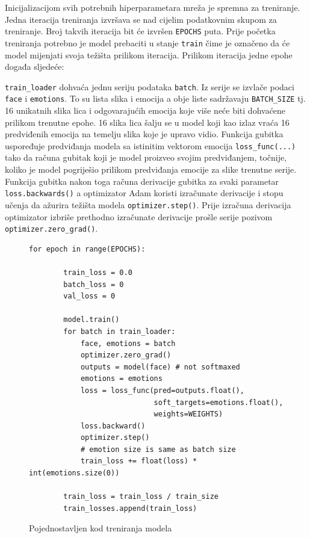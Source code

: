 \documentclass[times, utf8, zavrsni,numeric,pstricks]{fer}
\begin{document}
Inicijalizacijom svih potrebnih hiperparametara mreža je spremna za treniranje. Jedna iteracija treniranja izvršava se nad cijelim podatkovnim skupom za treniranje. Broj takvih iteracija bit će izvršen \lstinline"EPOCHS" puta. Prije početka treniranja potrebno je model prebaciti u stanje \lstinline"train" čime je označeno da će model mijenjati svoja težišta prilikom iteracija. Prilikom iteracija jedne epohe događa sljedeće:

\lstinline"train_loader" dohvaća jednu seriju podataka \lstinline"batch". Iz serije se izvlače podaci \lstinline"face" i \lstinline"emotions". To su lista slika i emocija a obje liste sadržavaju \lstinline"BATCH_SIZE" tj. 16 unikatnih slika lica i odgovarajućih emocija koje više neće biti dohvaćene prilikom trenutne epohe. 16 slika lica šalju se u model koji kao izlaz vraća 16 predviđenih emocija na temelju slika koje je upravo vidio. Funkcija gubitka  uspoređuje predviđanja modela sa istinitim vektorom emocija \lstinline"loss_func(...)" tako da računa gubitak koji je model proizveo svojim predviđanjem, točnije, koliko je model pogriješio prilikom predviđanja emocije za slike trenutne serije. Funkcija gubitka nakon toga računa derivacije gubitka za svaki parametar \lstinline"loss.backwards()" a optimizator Adam koristi izračunate derivacije i stopu učenja da ažurira težišta modela \lstinline"optimizer.step()". Prije izračuna derivacija optimizator izbriše prethodno izračunate derivacije prošle serije pozivom \lstinline"optimizer.zero_grad()".
	
\begin{figure}[H]
\centering
\begin{Verbatim}[fontsize=\small]
for epoch in range(EPOCHS):

        train_loss = 0.0
        batch_loss = 0
        val_loss = 0

        model.train()
        for batch in train_loader:
            face, emotions = batch
            optimizer.zero_grad()
            outputs = model(face) # not softmaxed
            emotions = emotions
            loss = loss_func(pred=outputs.float(),
                             soft_targets=emotions.float(),
                             weights=WEIGHTS)
            loss.backward()
            optimizer.step()
            # emotion size is same as batch size
            train_loss += float(loss) * int(emotions.size(0)) 

        train_loss = train_loss / train_size
        train_losses.append(train_loss)
\end{Verbatim}
\caption{Pojednostavljen kod treniranja modela}
\label{pic:pytorch_transform_aug}
\end{figure}
\end{document}
